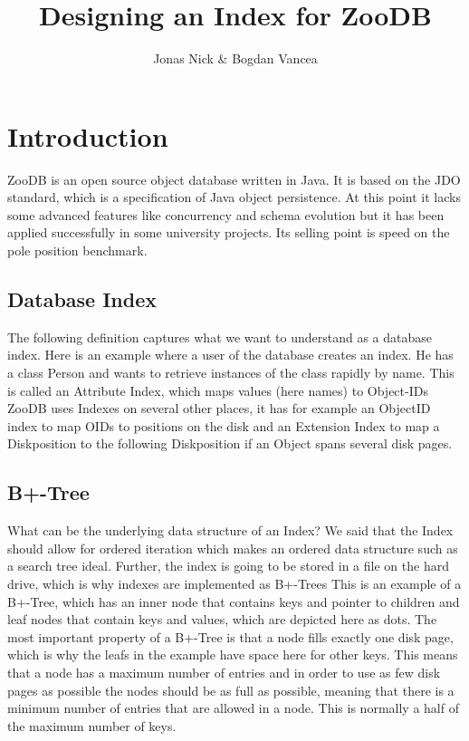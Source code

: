 \documentclass[11pt,a4paper,oneside]{article}
\begin{document}
\graphicspath{ {images/} }
\title{Designing an Index for ZooDB}
\author{Jonas Nick \& Bogdan Vancea}
\maketitle
\tableofcontents

\section{Introduction}
ZooDB is an open source object database written in Java. It is based on the JDO standard, which is a specification of Java object persistence.
At this point it lacks some advanced features like concurrency and schema evolution but it has been applied successfully in some university projects. Its selling point is speed on the pole position benchmark.
\subsection{Database Index}
 The following definition captures what we want to understand as a database index.
 Here is an example where a user of the database creates an index. He has a class Person and wants to retrieve instances of the class rapidly by name.
 This is called an Attribute Index, which maps values (here names) to Object-IDs
 ZooDB uses Indexes on several other places, it has for example an ObjectID index to map OIDs to positions on the disk and an Extension Index to map a Diskposition to the following Diskposition if an Object spans several disk pages. 

\subsection{B+-Tree}
 What can be the underlying data structure of an Index? We said that the Index should allow for ordered iteration which makes an ordered data structure such as a search tree ideal. Further, the index is going to be stored in a file on the hard drive, which is why indexes are implemented as B+-Trees
 This is an example of a B+-Tree, which has an inner node that contains keys and pointer to children and leaf nodes that contain keys and values, which are depicted here as dots.
 The most important property of a B+-Tree is that a node fills exactly one disk page, which is why the leafs in the example have space here for other keys.
 This means that a node has a maximum number of entries and in order to use as few disk pages as possible the nodes should be as full as possible, meaning that there is a minimum number of entries that are allowed in a node. This is normally a half of the maximum number of keys.
\end{document}
